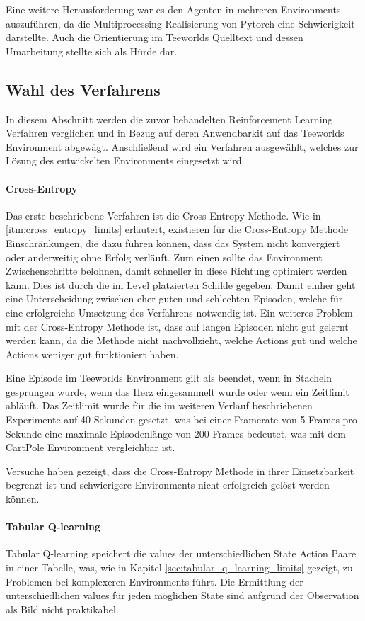 \documentclass[11pt]{scrartcl}
\begin{document}
Eine weitere Herausforderung war es den Agenten in mehreren Environments auszuführen, da
die Multiprocessing Realisierung von Pytorch eine Schwierigkeit darstellte. Auch die
Orientierung im Teeworlds Quelltext und dessen Umarbeitung stellte sich als Hürde dar.

\subsection{Wahl des Verfahrens}
In diesem Abschnitt werden die zuvor behandelten Reinforcement Learning Verfahren
verglichen und in Bezug auf deren Anwendbarkit auf das Teeworlds Environment abgewägt.
Anschließend wird ein Verfahren ausgewählt, welches zur Lösung des entwickelten
Environments eingesetzt wird.

\paragraph{Cross-Entropy}
Das erste beschriebene Verfahren ist die Cross-Entropy Methode. Wie in
\autoref{itm:cross_entropy_limits} erläutert, existieren für die Cross-Entropy Methode
Einschränkungen, die dazu führen können, dass das System nicht konvergiert oder anderweitig
ohne Erfolg verläuft. Zum einen sollte das Environment Zwischenschritte belohnen,
damit schneller in diese Richtung optimiert werden kann. Dies ist durch die im Level
platzierten Schilde gegeben. Damit einher geht eine Unterscheidung zwischen eher guten
und schlechten Episoden, welche für eine erfolgreiche Umsetzung des Verfahrens notwendig
ist. Ein weiteres Problem mit der Cross-Entropy Methode ist, dass auf langen Episoden
nicht gut gelernt werden kann, da die Methode nicht nachvollzieht, welche Actions gut
und welche Actions weniger gut funktioniert haben. 

Eine Episode im Teeworlds Environment gilt als beendet, wenn in Stacheln gesprungen wurde, 
wenn das Herz eingesammelt wurde oder wenn ein Zeitlimit abläuft. Das Zeitlimit wurde für
die im weiteren Verlauf beschriebenen Experimente auf 40 Sekunden gesetzt, was bei einer
Framerate von 5 Frames pro Sekunde eine maximale Episodenlänge von 200 Frames bedeutet,
was mit dem CartPole Environment vergleichbar ist. %

Versuche haben gezeigt, dass die Cross-Entropy Methode in ihrer Einsetzbarkeit begrenzt
ist und schwierigere Environments nicht erfolgreich gelöst werden können. %

\paragraph{Tabular Q-learning}
Tabular Q-learning speichert die values der unterschiedlichen State Action Paare in einer
Tabelle, was, wie in Kapitel \ref{sec:tabular_q_learning_limits} gezeigt, zu Problemen bei
komplexeren Environments führt. Die Ermittlung der unterschiedlichen values für jeden
möglichen State sind aufgrund der Observation als Bild nicht praktikabel.
\end{document}

